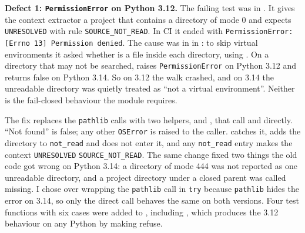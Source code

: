 \begin{sloppypar}
\textbf{Defect 1: \texttt{PermissionError} on Python 3.12.} The failing test was  in . It gives the context extractor a project that contains a directory of mode 0 and expects \texttt{UNRESOLVED} with rule \texttt{SOURCE\_NOT\_READ}. In CI it ended with \texttt{PermissionError: [Errno 13] Permission denied}. The cause was in  in : to skip virtual environments it asked whether  is a file inside each directory, using . On a directory that may not be searched,  raises \texttt{PermissionError} on Python 3.12 and returns false on Python 3.14. So on 3.12 the walk crashed, and on 3.14 the unreadable directory was quietly treated as ``not a virtual environment''. Neither is the fail-closed behaviour the module requires.
\end{sloppypar}

\begin{sloppypar}
The fix replaces the \texttt{pathlib} calls with two helpers,  and , that call  and  directly. ``Not found'' is false; any other \texttt{OSError} is raised to the caller.  catches it, adds the directory to \texttt{not\_read} and does not enter it, and any \texttt{not\_read} entry makes the context \texttt{UNRESOLVED} \texttt{SOURCE\_NOT\_READ}. The same change fixed two things the old code got wrong on Python 3.14: a directory of mode 444 was not reported as one unreadable directory, and a project directory under a closed parent was called missing. I chose  over wrapping the \texttt{pathlib} call in \texttt{try} because \texttt{pathlib} hides the error on 3.14, so only the direct call behaves the same on both versions. Four test functions with six cases were added to , including , which produces the 3.12 behaviour on any Python by making  refuse.
\end{sloppypar}

